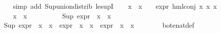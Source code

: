 \begin{isabellebody}
\ \ \ \ \isamarkupfalse%
\ {\isacharparenleft}{\kern0pt}simp\ add{\isacharcolon}{\kern0pt}\ Sup{\isacharunderscore}{\kern0pt}union{\isacharunderscore}{\kern0pt}distrib\ le{\isacharunderscore}{\kern0pt}supI{}{\isacharparenright}{\kern0pt}\isanewline
\ \ \isamarkupfalse%
\ {\isachardoublequoteopen}{\isacharparenleft}{\kern0pt}x{}\ {\isacharbackquote}{\kern0pt}\ x{}\ {\isacharequal}{\kern0pt}\ {\isacharbraceleft}{\kern0pt}{\isacharbraceright}{\kern0pt}{\isacharparenright}{\kern0pt}\ {\isasymlongrightarrow}\ {\isacharparenleft}{\kern0pt}expr{\isacharunderscore}{\kern0pt}{}\ {\isacharparenleft}{\kern0pt}hml{\isacharunderscore}{\kern0pt}conj\ x{}\ x{}\ x{}{\isacharparenright}{\kern0pt}\ {\isasymge}\ {}{\isacharparenright}{\kern0pt}{\isachardoublequoteclose}\isanewline
\ \ \isamarkupfalse%
\isanewline
\ \ \ \ \isamarkupfalse%
\ {\isachardoublequoteopen}x{}\ {\isacharbackquote}{\kern0pt}\ x{}\ {\isacharequal}{\kern0pt}\ {\isacharbraceleft}{\kern0pt}{\isacharbraceright}{\kern0pt}{\isachardoublequoteclose}\isanewline
\ \ \ \ \isamarkupfalse%
\ {\isachardoublequoteopen}{}\ {\isasymle}\ {\isacharparenleft}{\kern0pt}Sup\ {\isacharparenleft}{\kern0pt}{\isacharparenleft}{\kern0pt}expr{\isacharunderscore}{\kern0pt}{}\ {\isasymcirc}\ x{}{\isacharparenright}{\kern0pt}\ {\isacharbackquote}{\kern0pt}\ x{}{\isacharparenright}{\kern0pt}{\isacharparenright}{\kern0pt}{\isachardoublequoteclose}\ \isanewline
\ \ \ \ \ \ \isamarkupfalse%
\ {\isacartoucheopen}{}\ {\isasymle}\ {\isacharparenleft}{\kern0pt}Sup\ {\isacharparenleft}{\kern0pt}{\isacharparenleft}{\kern0pt}expr{\isacharunderscore}{\kern0pt}{}\ {\isasymcirc}\ x{}{\isacharparenright}{\kern0pt}\ {\isacharbackquote}{\kern0pt}\ x{}\ {\isasymunion}\ {\isacharparenleft}{\kern0pt}expr{\isacharunderscore}{\kern0pt}{}\ {\isasymcirc}\ x{}{\isacharparenright}{\kern0pt}\ {\isacharbackquote}{\kern0pt}\ x{}\ {\isasymunion}\ {\isacharparenleft}{\kern0pt}expr{\isacharunderscore}{\kern0pt}{}\ {\isasymcirc}\ x{}{\isacharparenright}{\kern0pt}\ {\isacharbackquote}{\kern0pt}\ x{}{\isacharparenright}{\kern0pt}{\isacharparenright}{\kern0pt}{\isacartoucheclose}\isanewline
\ \ \ \ \ \ \isamarkupfalse%
\ bot{\isacharunderscore}{\kern0pt}enat{\isacharunderscore}{\kern0pt}def\ \isamarkupfalse%

\end{isabellebody}

